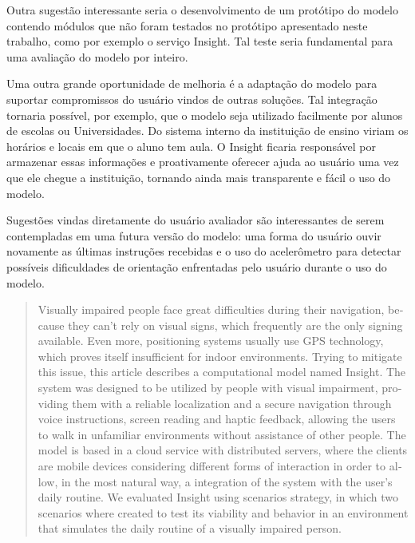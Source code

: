 \documentclass[twoside,english,brazilian]{UNISINOSartigo}
\begin{document}
Outra sugestão interessante seria o desenvolvimento de um protótipo do modelo contendo módulos que não foram testados no protótipo apresentado neste trabalho, como por exemplo o serviço Insight. Tal teste seria fundamental para uma avaliação do modelo por inteiro.

Uma outra grande oportunidade de melhoria é a adaptação do modelo para suportar compromissos do usuário vindos de outras soluções. Tal integração tornaria possível, por exemplo, que o modelo seja utilizado facilmente por alunos de escolas ou Universidades. Do sistema interno da instituição de ensino viriam os horários e locais em que o aluno tem aula. O Insight ficaria responsável por armazenar essas informações e proativamente oferecer ajuda ao usuário uma vez que ele chegue a instituição, tornando ainda mais transparente e fácil o uso do modelo.

Sugestões vindas diretamente do usuário avaliador são interessantes de serem contempladas em uma futura versão do modelo: uma forma do usuário ouvir novamente as últimas instruções recebidas e o uso do acelerômetro para detectar possíveis dificuldades de orientação enfrentadas pelo usuário durante o uso do modelo.





\begin{otherlanguage}{english}
\begin{abstract}
Visually impaired people face great difficulties during their navigation, because they can't rely on visual signs, which frequently are the only signing available. Even more, positioning systems usually use GPS technology, which proves itself insufficient for indoor environments. Trying to mitigate this issue, this article describes a computational model named Insight. The system was designed to be utilized by people with visual impairment, providing them with a reliable localization and a secure navigation through voice instructions, screen reading and haptic feedback, allowing the users to walk in unfamiliar environments without assistance of other people. The model is based in a cloud service with distributed servers, where the clients are mobile devices considering different forms of interaction in order to allow, in the most natural way, a integration of the system with the user's daily routine. We evaluated Insight using scenarios strategy, in which two scenarios where created to test its viability and behavior in an environment that simulates the daily routine of a visually impaired person.


\end{abstract}
\end{otherlanguage}
\end{document}
